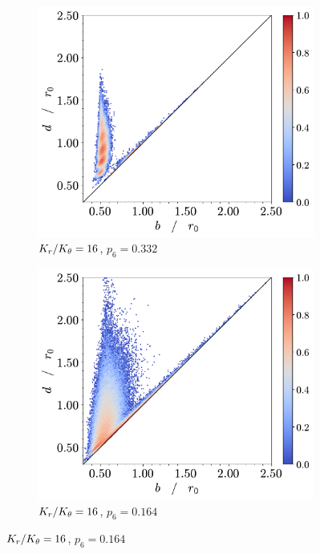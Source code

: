 \begin{figure}[tbp]
        \begin{subfigure}[b]{0.40\textwidth}
         \centering
         \includegraphics[width=\textwidth]{./figures/ph/t_k16_231_bs_pd.pdf}
         \caption{$K_r/K_\theta=16$, $p_6=0.332$}%
         \label{fig:bspdc}
     \end{subfigure}
     \hspace{1cm}
      \begin{subfigure}[b]{0.40\textwidth}
         \centering
         \includegraphics[width=\textwidth]{./figures/ph/t_k16_0_bs_pd.pdf}
         \caption{$K_r/K_\theta=16$, $p_6=0.164$}%
         \label{fig:bspdd}
     \end{subfigure}



\end{figure}
